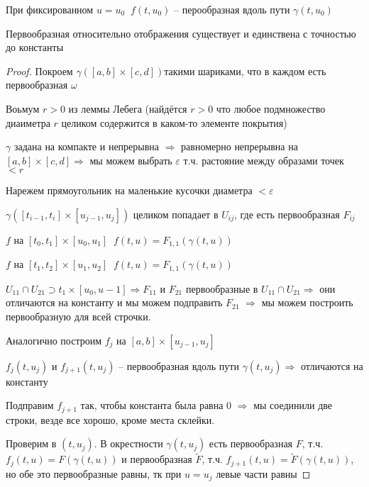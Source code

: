 \begin{remark}\thmslashn
	
	При фиксированном $u = u_0\;\; f(t, u_0)$ -- перообразная вдоль пути $\gamma(t, u_0)$ 

\end{remark}

\begin{theorem}\thmslashn

	Первообразная относительно отображения существует и единствена с точностью до константы

\end{theorem}

\begin{proof}\thmslashn
	
	Покроем $\gamma([a, b]\times[c, d])$такими шариками, что в каждом есть первообразная $\omega$
	
	Воьмум $r > 0$ из леммы Лебега (найдётся $r > 0$ что любое подмножество диаиметра $r$ целиком содержится в каком-то элементе покрытия)
	
	$\gamma$ задана на компакте и непрерывна $\Rightarrow$ равномерно непрерывна на $[a, b]\times[c, d] \Rightarrow$ мы можем выбрать $\varepsilon$ т.ч. растояние между образами точек $< r$
	
	Нарежем прямоугольник на маленькие кусочки диаметра $< \varepsilon$ 
		
	$\gamma([t_{i-1}, t_i]\times[u_{j-1}, u_j])$ целиком попадает в $U_{ij}$, где есть первообразная $F_{ij}$
	
	$f$ на $[t_{0}, t_1]\times[u_{0}, u_1] \;\; f(t, u) = F_{1, 1}(\gamma(t, u))$ 
	
	$f$ на $[t_{1}, t_2]\times[u_{1}, u_2] \;\; f(t, u) = F_{1, 1}(\gamma(t, u))$ 
	
	$U_{11} \cap U_{21} \supset {t_1} \times[u_0, u-1] \Rightarrow F_{11}$ и $F_{21}$ первообразные в $U_{11} \cap U_{21} \Rightarrow$ они отличаются на константу и мы можем подправить $F_{21}$ $\Rightarrow$ мы можем построить первообразную для всей строчки.
	
	Аналогично построим $f_j$ на $[a, b]\times[u_{j-1}, u_j]$
	
	$f_j(t, u_j)$ и $f_{j+1}(t, u_j)$ -- первообразная вдоль пути $\gamma(t, u_j) \Rightarrow$ отличаются на константу
	
	Подправим $f_{j+1}$ так, чтобы константа была равна 0 $\Rightarrow$ мы соединили две строки, везде все хорошо, кроме места склейки.
	
	Проверим в $(t, u_j)$. В окрестности $\gamma(t, u_j)$ есть первообразная $F$, т.ч. $f_j(t, u) = F(\gamma(t, u))$ и первообразная $\tilde{F}$, т.ч. $f_{j+1}(t, u) = \tilde{F}(\gamma(t, u))$, но обе это первообразные равны, тк при $u = u_j$ левые части равны
	
\end{proof}
